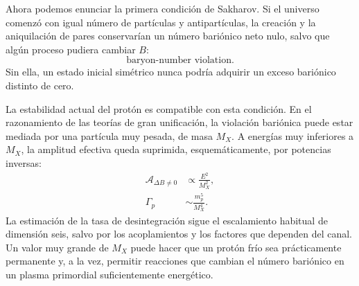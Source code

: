\begin{classroomqa}
\end{classroomqa}

Ahora podemos enunciar la primera condición de Sakharov. Si el universo comenzó con igual número de partículas y antipartículas, la creación y la aniquilación de pares conservarían un número bariónico neto nulo, salvo que algún proceso pudiera cambiar \(B\):
\begin{equation}
\boxed{\text{baryon-number violation}.}
\end{equation}
Sin ella, un estado inicial simétrico nunca podría adquirir un exceso bariónico distinto de cero.

La estabilidad actual del protón es compatible con esta condición. En el razonamiento de las teorías de gran unificación, la violación bariónica puede estar mediada por una partícula muy pesada, de masa \(M_X\). A energías muy inferiores a \(M_X\), la amplitud efectiva queda suprimida, esquemáticamente, por potencias inversas:
\begin{equation}
\begin{aligned}
\mathcal A_{\Delta B\ne0}&\propto \frac{E^2}{M_X^2},\\
\Gamma_p&\sim \frac{m_p^5}{M_X^4}.
\end{aligned}
\label{eq:c08-heavy-suppression}
\end{equation}
La estimación de la tasa de desintegración sigue el escalamiento habitual de dimensión seis, salvo por los acoplamientos y los factores que dependen del canal. Un valor muy grande de \(M_X\) puede hacer que un protón frío sea prácticamente permanente y, a la vez, permitir reacciones que cambian el número bariónico en un plasma primordial suficientemente energético.

\begin{classroomqa}
\end{classroomqa}

